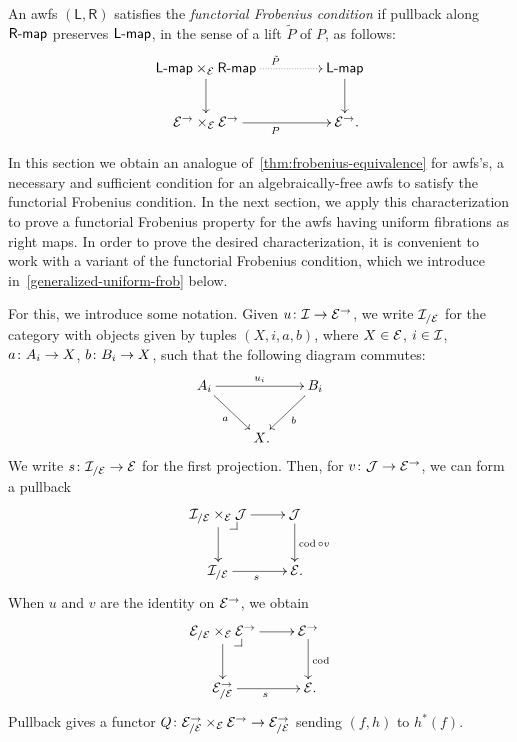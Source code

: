 \documentclass[reqno,10pt,a4paper,oneside,draft]{amsart}
\newcommand{\LL}{\mathsf{L}}
\newcommand{\RR}{\mathsf{R}}
\begin{document}
{{\begin{definition} \label{functorial-frobenius}
An awfs $(\LL, \RR)$ satisfies the \emph{functorial Frobenius condition} if pullback along $\palg{\RR}$ preserves $\pcoalg{\LL}$, in the sense of a lift $\tilde{P}$ of $P$, as follows:
\[
\xymatrix@C+2em{
  \pcoalg{\LL} \times_{\cal{E}} \palg{\RR}
  \ar@{.>}[r]^{\tilde{P}}
  \ar[d]
&
  \pcoalg{\LL}
  \ar[d]
\\
  \cal{E}^\to \times_{\cal{E}} \cal{E}^\to
  \ar[r]_{P}
&
  \cal{E}^\to
\rlap{.}}
\]
\end{definition}

In this section we obtain an analogue of~\cref{thm:frobenius-equivalence} for awfs's, \ie a necessary and sufficient condition for an algebraically-free awfs to satisfy the functorial Frobenius condition.
In the next section, we apply this characterization to prove a functorial Frobenius property for the awfs having uniform fibrations as right maps.
In order to prove the desired characterization, it is convenient to work with a variant of the functorial Frobenius condition, which we introduce in~\cref{generalized-uniform-frob} below.

For this, we introduce some notation.
Given $u \co \cal{I} \to \cal{E}^\to$, we write $\cal{I}_{/\cal{E}}$ for the category with objects given by 
tuples $(X, i, a, b)$, where $X \in \cal{E}$, $i \in \cal{I}$, $a \co A_i \to X$, $b \co B_i \to X$, such that the following diagram commutes:
\[
\xymatrix{
A_i \ar[dr]_a \ar[rr]^{u_i} & & B_i \ar[dl]^{b} \\
 & X \rlap{.} & }
\]
We write $s \co \cal{I}_{/\cal{E}} \to \cal{E}$ for the first projection.
Then, for $v \co \cal{J} \to \cal{E}^\to$, we can form a pullback
\[
\xymatrix{
  \cal{I}_{/\cal{E}} \times_{\cal{E}} \cal{J}
  \ar[r]
  \ar[d]
  \pullback{dr}
&
  \cal{J}
  \ar[d]^{\cod \cc v}
\\
  \cal{I}_{/\cal{E}}
  \ar[r]_s
&
  \cal{E}
\rlap{.}}
\]
When $u$ and $v$ are the identity on $\cal{E}^\to$, we obtain
\[
\xymatrix{
  \cal{E}_{/\cal{E}} \times_{\cal{E}} \cal{E}^\to
  \ar[r]
  \ar[d]
  \pullback{dr}
&
  \cal{E}^\to
  \ar[d]^{\cod}
\\
  \cal{E}^\to_{/\cal{E}}
  \ar[r]_s
&
  \cal{E}
\rlap{.}}
\]
Pullback gives a functor $Q \co  \cal{E}^\to_{/\cal{E}} \times_{\cal{E}} \cal{E}^\to \to \cal{E}_{/\cal{E}}^\to$ sending $(f, h)$ to $h^*(f)$.

}}
\end{document}
